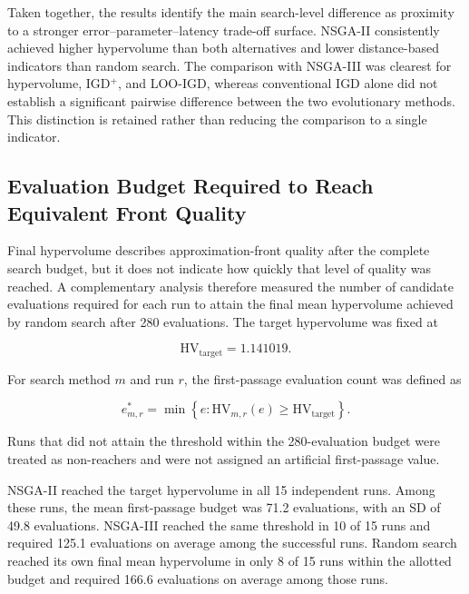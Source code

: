 \documentclass[a4paper,fleqn]{cas-sc}
\begin{document}
Taken together, the results identify the main search-level difference as proximity to a stronger error--parameter--latency trade-off surface. NSGA-II consistently achieved higher hypervolume than both alternatives and lower distance-based indicators than random search. The comparison with NSGA-III was clearest for hypervolume, IGD$^{+}$, and LOO-IGD, whereas conventional IGD alone did not establish a significant pairwise difference between the two evolutionary methods. This distinction is retained rather than reducing the comparison to a single indicator.


\subsection{Evaluation Budget Required to Reach Equivalent Front Quality}
\label{sec:budget_parity}

Final hypervolume describes approximation-front quality after the complete search budget, but it does not indicate how quickly that level of quality was reached. A complementary analysis therefore measured the number of candidate evaluations required for each run to attain the final mean hypervolume achieved by random search after 280 evaluations. The target hypervolume was fixed at

\begin{equation}
\mathrm{HV}_{\mathrm{target}} = 1.141019.
\label{eq:hv_parity_threshold}
\end{equation}

For search method $m$ and run $r$, the first-passage evaluation count was defined as

\begin{equation}
e^{*}_{m,r}
=
\min
\left\{
e :
\mathrm{HV}_{m,r}(e)
\geq
\mathrm{HV}_{\mathrm{target}}
\right\}.
\label{eq:first_passage}
\end{equation}

Runs that did not attain the threshold within the 280-evaluation budget were treated as non-reachers and were not assigned an artificial first-passage value.

NSGA-II reached the target hypervolume in all 15 independent runs. Among these runs, the mean first-passage budget was 71.2 evaluations, with an SD of 49.8 evaluations. NSGA-III reached the same threshold in 10 of 15 runs and required 125.1 evaluations on average among the successful runs. Random search reached its own final mean hypervolume in only 8 of 15 runs within the allotted budget and required 166.6 evaluations on average among those runs.
\end{document}
